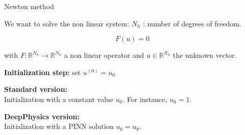 \begin{frame}{Newton method}
    

    We want to solve the non linear system: \hfill \tiny $N_h$ : number of degrees of freedom.

    \normalsize
    \vspace{-10pt}
    \begin{equation}
        \label{eq:nonlinear}
        F(u) = 0 
    \end{equation}

    \vspace{-2pt}
    with $F:\mathbb{R}^{N_h} \to \mathbb{R}^{N_h}$ a non linear operator and $u\in\mathbb{R}^{N_h}$ the unknown vector.

    \begin{center}
        \small
        \begin{minipage}{0.9\linewidth}
            \begin{algorithm}[H]
                \SetAlgoLined
                \caption{Newton's method to solve \eqref{eq:nonlinear} \citep{newton_accel_2025}}
                \textbf{Initialization step:} set $u^{(0)} = u_0$\;
            \end{algorithm}
        \end{minipage}
    \end{center}

    \vspace{5pt}
    \textbf{Standard version:} \\
    Initialization with a constant value $u_0$. For instance, $u_0=1$.

    \vspace{5pt}
    \textbf{DeepPhysics version:} \citep{odot_deepphysics_2021} \\
    Initialization with a PINN solution $u_0=u_\theta$.
\end{frame}

